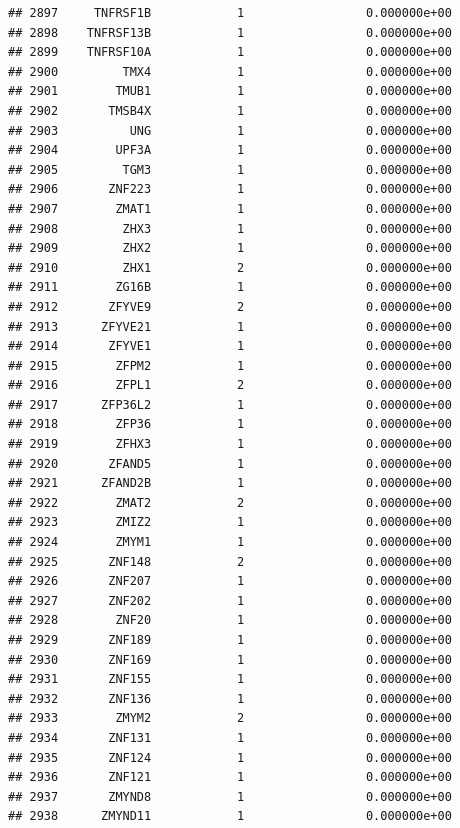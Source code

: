 \documentclass[
]{article}
\begin{document}
\begin{verbatim}
## 2897     TNFRSF1B            1                 0.000000e+00
## 2898    TNFRSF13B            1                 0.000000e+00
## 2899    TNFRSF10A            1                 0.000000e+00
## 2900         TMX4            1                 0.000000e+00
## 2901        TMUB1            1                 0.000000e+00
## 2902       TMSB4X            1                 0.000000e+00
## 2903          UNG            1                 0.000000e+00
## 2904        UPF3A            1                 0.000000e+00
## 2905         TGM3            1                 0.000000e+00
## 2906       ZNF223            1                 0.000000e+00
## 2907        ZMAT1            1                 0.000000e+00
## 2908         ZHX3            1                 0.000000e+00
## 2909         ZHX2            1                 0.000000e+00
## 2910         ZHX1            2                 0.000000e+00
## 2911        ZG16B            1                 0.000000e+00
## 2912       ZFYVE9            2                 0.000000e+00
## 2913      ZFYVE21            1                 0.000000e+00
## 2914       ZFYVE1            1                 0.000000e+00
## 2915        ZFPM2            1                 0.000000e+00
## 2916        ZFPL1            2                 0.000000e+00
## 2917      ZFP36L2            1                 0.000000e+00
## 2918        ZFP36            1                 0.000000e+00
## 2919        ZFHX3            1                 0.000000e+00
## 2920       ZFAND5            1                 0.000000e+00
## 2921      ZFAND2B            1                 0.000000e+00
## 2922        ZMAT2            2                 0.000000e+00
## 2923        ZMIZ2            1                 0.000000e+00
## 2924        ZMYM1            1                 0.000000e+00
## 2925       ZNF148            2                 0.000000e+00
## 2926       ZNF207            1                 0.000000e+00
## 2927       ZNF202            1                 0.000000e+00
## 2928        ZNF20            1                 0.000000e+00
## 2929       ZNF189            1                 0.000000e+00
## 2930       ZNF169            1                 0.000000e+00
## 2931       ZNF155            1                 0.000000e+00
## 2932       ZNF136            1                 0.000000e+00
## 2933        ZMYM2            2                 0.000000e+00
## 2934       ZNF131            1                 0.000000e+00
## 2935       ZNF124            1                 0.000000e+00
## 2936       ZNF121            1                 0.000000e+00
## 2937       ZMYND8            1                 0.000000e+00
## 2938      ZMYND11            1                 0.000000e+00

\end{verbatim}
\end{document}
